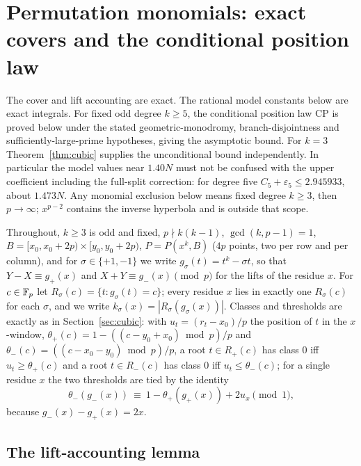\section{Permutation monomials: exact covers and the conditional position law}\label{sec:perm}

The cover and lift accounting are exact.  The rational model constants below are exact integrals.
For fixed odd degree $k\ge5$, the conditional position law CP is proved below under the stated geometric-monodromy,
branch-disjointness and sufficiently-large-prime hypotheses, giving the asymptotic bound.
For $k=3$ Theorem~\ref{thm:cubic} supplies the unconditional bound independently.
In particular the model values near $1.40N$ must not be confused with the upper coefficient including the full-split correction:
for degree five $C_5+\varepsilon_5\le2.945933$, about $1.473N$.
Any monomial exclusion below means fixed degree $k\ge3$, then $p\to\infty$; $x^{p-2}$ contains the inverse hyperbola and is outside that scope.

Throughout, $k\ge3$ is odd and fixed, $p\nmid k(k-1)$, $\gcd(k,p-1)=1$, $B=[x_0,x_0+2p)\times[y_0,y_0+2p)$, $P=P(x^k,B)$ ($4p$ points, two per row and
per column), and for $\sigma\in\{+1,-1\}$ we write $g_\sigma(t)=t^k-\sigma t$, so that $Y-X\equiv g_+(x)$ and $X+Y\equiv g_-(x)\pmod p$ for the lifts of the
residue $x$.  For $c\in\mathbb{F}_p$ let $R_\sigma(c)=\{t: g_\sigma(t)=c\}$; every residue $x$ lies in exactly one $R_\sigma(c)$ for each $\sigma$, and we write
$k_\sigma(x)=|R_\sigma(g_\sigma(x))|$.  Classes and thresholds are exactly as in Section~\ref{sec:cubic}: with $u_t=(r_t-x_0)/p$ the position of $t$ in the
$x$-window, $\theta_+(c)=1-((c-y_0+x_0)\bmod p)/p$ and $\theta_-(c)=((c-x_0-y_0)\bmod p)/p$, a root $t\in R_+(c)$ has class $0$ iff $u_t\ge\theta_+(c)$ and a root
$t\in R_-(c)$ has class $0$ iff $u_t\le\theta_-(c)$; for a single residue $x$ the two thresholds are tied by the identity
\begin{equation}\label{eq:tie}
 \theta_-(g_-(x))\ \equiv\ 1-\theta_+(g_+(x))+2u_x\pmod 1 ,
\end{equation}
because $g_-(x)-g_+(x)=2x$.

\subsection*{The lift-accounting lemma}

